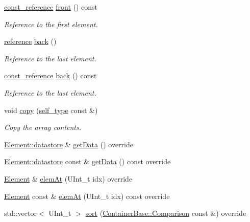 \begin{DoxyCompactItemize}
\hyperlink{classpanda_1_1Array_a64dff4ee5d35a16425535f06c3e2b3e2}{const\_\-reference} \hyperlink{classpanda_1_1Array_a1d8403dec0e8b63a66dabe2050055326}{front} () const 
\begin{DoxyCompactList}\small\item\em Reference to the first element. \item\end{DoxyCompactList}\item 
\hyperlink{classpanda_1_1Array_a87028232d5fb96ae20e58e1a92dfe708}{reference} \hyperlink{classpanda_1_1Array_a4f8973eed439312b468841ebb1a71717}{back} ()
\begin{DoxyCompactList}\small\item\em Reference to the last element. \item\end{DoxyCompactList}\item 
\hyperlink{classpanda_1_1Array_a64dff4ee5d35a16425535f06c3e2b3e2}{const\_\-reference} \hyperlink{classpanda_1_1Array_ab0134351628f5472db5984f5bc3531c3}{back} () const 
\begin{DoxyCompactList}\small\item\em Reference to the last element. \item\end{DoxyCompactList}\item 
void \hyperlink{classpanda_1_1Array_a7f44ada4aad69c0003de67667c646eb4}{copy} (\hyperlink{classpanda_1_1Array}{self\_\-type} const \&)
\begin{DoxyCompactList}\small\item\em Copy the array contents. \item\end{DoxyCompactList}\item 
\hyperlink{structpanda_1_1Element_1_1datastore}{Element::datastore} \& \hyperlink{classpanda_1_1Array_afb11a43b477291e33ee21f9764f118bd}{getData} () override
\item 
\hyperlink{structpanda_1_1Element_1_1datastore}{Element::datastore} const \& \hyperlink{classpanda_1_1Array_a8c992f9d8b7c2bff6a3a4a5d9e27b821}{getData} () const override
\item 
\hyperlink{classpanda_1_1Element}{Element} \& \hyperlink{classpanda_1_1Array_ae289d17a257c3a51d1c9184f2c05e413}{elemAt} (UInt\_\-t idx) override
\item 
\hyperlink{classpanda_1_1Element}{Element} const \& \hyperlink{classpanda_1_1Array_a99882399da6b65a14d6de794bcbe7c15}{elemAt} (UInt\_\-t idx) const override
\item 
std::vector$<$ UInt\_\-t $>$ \hyperlink{classpanda_1_1Array_a5c73a2221ab0eef710765585279a6c32}{sort} (\hyperlink{classpanda_1_1ContainerBase_a5269fda4f420b52d6ed9c0dac548559e}{ContainerBase::Comparison} const \&) override
\end{DoxyCompactItemize}
